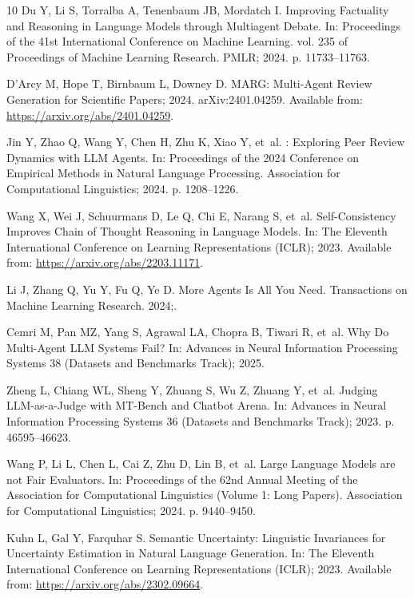 \documentclass[10pt,letterpaper]{article}
\begin{document}
\begin{thebibliography}{10}
Du Y, Li S, Torralba A, Tenenbaum JB, Mordatch I.
\newblock Improving Factuality and Reasoning in Language Models through
  Multiagent Debate.
\newblock In: Proceedings of the 41st International Conference on Machine
  Learning. vol. 235 of Proceedings of Machine Learning Research. PMLR; 2024.
  p. 11733--11763.

D'Arcy M, Hope T, Birnbaum L, Downey D. {MARG}: Multi-Agent Review Generation
  for Scientific Papers; 2024.
\newblock arXiv:2401.04259.
\newblock Available from: \url{https://arxiv.org/abs/2401.04259}.

Jin Y, Zhao Q, Wang Y, Chen H, Zhu K, Xiao Y, et~al.
: Exploring Peer Review Dynamics with {LLM} Agents.
\newblock In: Proceedings of the 2024 Conference on Empirical Methods in
  Natural Language Processing. Association for Computational Linguistics; 2024.
  p. 1208--1226.

Wang X, Wei J, Schuurmans D, Le Q, Chi E, Narang S, et~al.
\newblock Self-Consistency Improves Chain of Thought Reasoning in Language
  Models.
\newblock In: The Eleventh International Conference on Learning Representations
  (ICLR); 2023. Available from: \url{https://arxiv.org/abs/2203.11171}.

Li J, Zhang Q, Yu Y, Fu Q, Ye D.
\newblock More Agents Is All You Need.
\newblock Transactions on Machine Learning Research. 2024;.

Cemri M, Pan MZ, Yang S, Agrawal LA, Chopra B, Tiwari R, et~al.
\newblock Why Do Multi-Agent {LLM} Systems Fail?
\newblock In: Advances in Neural Information Processing Systems 38 (Datasets
  and Benchmarks Track); 2025.

Zheng L, Chiang WL, Sheng Y, Zhuang S, Wu Z, Zhuang Y, et~al.
\newblock Judging {LLM}-as-a-Judge with {MT-Bench} and {Chatbot Arena}.
\newblock In: Advances in Neural Information Processing Systems 36 (Datasets
  and Benchmarks Track); 2023. p. 46595--46623.

Wang P, Li L, Chen L, Cai Z, Zhu D, Lin B, et~al.
\newblock Large Language Models are not Fair Evaluators.
\newblock In: Proceedings of the 62nd Annual Meeting of the Association for
  Computational Linguistics (Volume 1: Long Papers). Association for
  Computational Linguistics; 2024. p. 9440--9450.

Kuhn L, Gal Y, Farquhar S.
\newblock Semantic Uncertainty: Linguistic Invariances for Uncertainty
  Estimation in Natural Language Generation.
\newblock In: The Eleventh International Conference on Learning Representations
  (ICLR); 2023. Available from: \url{https://arxiv.org/abs/2302.09664}.


\end{thebibliography}
\end{document}
